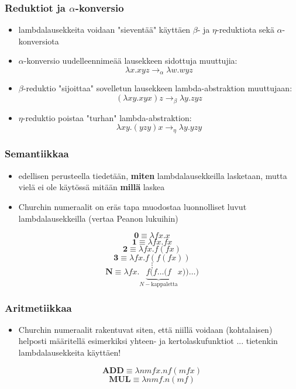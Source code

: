 \documentclass[12pt]{beamer}
\begin{document}
\begin{frame}
\frametitle{Reduktiot ja $\alpha$-konversio}
\begin{itemize}
\item lambdalausekkeita voidaan "sieventää" käyttäen $\beta$- ja $\eta$-reduktiota sekä $\alpha$-konversiota
\pause
\item $\alpha$-konversio uudelleennimeää lausekkeen sidottuja muuttujia:
\[ \lambda x . xyz  \rightarrow_{\alpha} \lambda w . wyz  \]
\pause
\item $\beta$-reduktio "sijoittaa" sovelletun lausekkeen lambda-abstraktion muuttujaan:
\[ (\lambda xy . xyx) z  \rightarrow_{\beta} \lambda y . zyz \]
\pause
\item $\eta$-reduktio poistaa "turhan" lambda-abstraktion:
\[ \lambda xy . (yzy) x \rightarrow_{\eta} \lambda y . yzy \]
\end{itemize}
\end{frame}

\begin{frame}
\frametitle{Semantiikkaa}
\begin{itemize}
\item edellisen perusteella tiedetään, \textbf{miten} lambdalausekkeilla lasketaan, mutta vielä ei ole käytössä mitään \textbf{millä} laskea
\pause
\item Churchin numeraalit on eräs tapa muodostaa luonnolliset luvut lambdalausekkeilla (vertaa Peanon lukuihin)	 
\end{itemize}
\pause

\[ \textbf{0} \equiv \lambda fx . x \]
\[ \textbf{1} \equiv \lambda fx . fx \]
\[ \textbf{2} \equiv \lambda fx . f (fx) \] 
\[ \textbf{3} \equiv \lambda fx . f(f(fx)) \]
\[ \vdots \]
\[ \textbf{N} \equiv \lambda fx . \underbrace{ f ( f \ldots (f }_{ N-\text{kappaletta}} x)) \ldots ) \] 
\end{frame}

\begin{frame}
\frametitle{Aritmetiikkaa}
\begin{itemize}
\item Churchin numeraalit rakentuvat siten, että niillä voidaan (kohtalaisen) helposti määritellä esimerkiksi yhteen- ja kertolaskufunktiot \pause \alert{... tietenkin lambdalausekkeita käyttäen!}
\end{itemize}
\pause
\[ \textbf{ADD} \equiv \lambda nmfx . n f (m f x) \] 
\pause
\[ \textbf{MUL} \equiv \lambda n m f . n (mf) \]
\end{frame}
\end{document}
